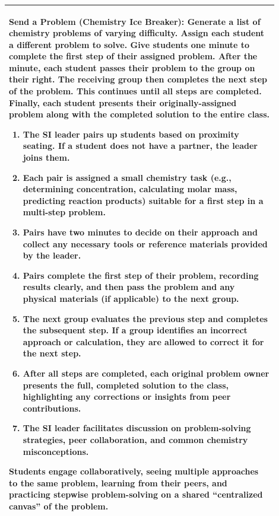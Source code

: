 \documentclass{article}
\begin{document}
\begin{tabular}{|p{0.9\linewidth}|}
\hline
\vspace{0.2cm}
\textbf{Send a Problem (Chemistry Ice Breaker):}
Generate a list of chemistry problems of varying difficulty. Assign each student a different problem to solve. Give students one minute to complete the first step of their assigned problem. After the minute, each student passes their problem to the group on their right. The receiving group then completes the next step of the problem. This continues until all steps are completed. Finally, each student presents their originally-assigned problem along with the completed solution to the entire class.

\begin{enumerate}
\item The SI leader pairs up students based on proximity seating. If a student does not have a partner, the leader joins them.
\item Each pair is assigned a small chemistry task (e.g., determining concentration, calculating molar mass, predicting reaction products) suitable for a first step in a multi-step problem.
\item Pairs have two minutes to decide on their approach and collect any necessary tools or reference materials provided by the leader.
\item Pairs complete the first step of their problem, recording results clearly, and then pass the problem and any physical materials (if applicable) to the next group.
\item The next group evaluates the previous step and completes the subsequent step. If a group identifies an incorrect approach or calculation, they are allowed to correct it for the next step.
\item After all steps are completed, each original problem owner presents the full, completed solution to the class, highlighting any corrections or insights from peer contributions.
\item The SI leader facilitates discussion on problem-solving strategies, peer collaboration, and common chemistry misconceptions.
\end{enumerate}

Students engage collaboratively, seeing multiple approaches to the same problem, learning from their peers, and practicing stepwise problem-solving on a shared “centralized canvas” of the problem.\\
\hline
\end{tabular}
\end{document}
